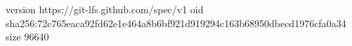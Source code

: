version https://git-lfs.github.com/spec/v1
oid sha256:72c765eaca92fd62e1e464a8b6bf921d919294c163b68950dbecd1976cfa0a34
size 96640
